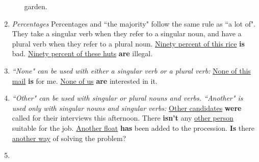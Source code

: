 \begin{enumerate}
\begin{enumerate}
                garden.
        \end{enumerate}
    \item
        {\it
        Percentages
        }
        \newline
        \newline
        Percentages and ``the majority" follow the same rule as ``a lot of".
        They take a singular verb when they refer to a singular noun, and have a
        plural verb when they refer to a plural noun.
        \newline
        \newline
        \underline{Ninety percent of this rice} \textbf{is} bad.
        \newline
        \newline
        \underline{Ninety percent of these huts} \textbf{are} illegal.
    \item
        {\it
        ``None" can be used with either a singular verb or a plural verb:
        }
        \newline
        \newline
        \underline{None of this mail} \textbf{is} for me.
        \newline
        \newline
        \underline{None of us} \textbf{are} interested in it.
    \item
        {\it
        ``Other" can be used with singular or plural nouns and verbs.
        \newline
        ``Another" is used only with singular nouns and singular verbs:
        }
        \newline
        \newline
        \underline{Other candidates} \textbf{were} called for their interviews
        this afternoon.
        \newline
        \newline
        There \textbf{isn't} any \underline{other person} suitable for the job.
        \newline
        \newline
        \underline{Another float} \textbf{has} been added to the procession.
        \newline
        \newline
        \textbf{Is} there \underline{another way} of solving the problem?
    \item
        {\it
}
\end{enumerate}
